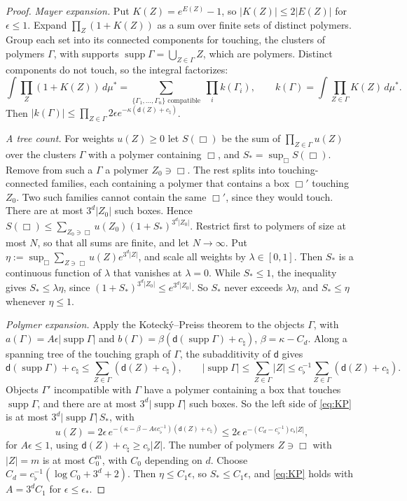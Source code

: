\begin{proof}
\emph{Mayer expansion.} Put $K(Z)=e^{E(Z)}-1$, so $|K(Z)|\le2|E(Z)|$ for $\epsilon\le1$. Expand $\prod_Z(1+K(Z))$ as a sum over finite sets of distinct polymers. Group each set into its connected components for touching, the clusters of polymers $\Gamma$, with supports $\operatorname{supp}\Gamma=\bigcup_{Z\in\Gamma}Z$, which are polymers. Distinct components do not touch, so the integral factorizes:
\[
\int\prod_Z(1+K(Z))\,d\mu^*=\sum_{\{\Gamma_1,\dots,\Gamma_n\}\text{ compatible}}\ \prod_ik(\Gamma_i),\qquad k(\Gamma)=\int\prod_{Z\in\Gamma}K(Z)\,d\mu^* .
\]
Then $|k(\Gamma)|\le\prod_{Z\in\Gamma}2\epsilon e^{-\kappa(\mathsf d(Z)+c_\natural)}$.

\emph{A tree count.} For weights $u(Z)\ge0$ let $S(\Box)$ be the sum of $\prod_{Z\in\Gamma}u(Z)$ over the clusters $\Gamma$ with a polymer containing $\Box$, and $S_*=\sup_\Box S(\Box)$. Remove from such a $\Gamma$ a polymer $Z_0\ni\Box$. The rest splits into touching-connected families, each containing a polymer that contains a box $\Box'$ touching $Z_0$. Two such families cannot contain the same $\Box'$, since they would touch. There are at most $3^d|Z_0|$ such boxes. Hence $S(\Box)\le\sum_{Z_0\ni\Box}u(Z_0)(1+S_*)^{3^d|Z_0|}$. Restrict first to polymers of size at most $N$, so that all sums are finite, and let $N\to\infty$. Put $\eta:=\sup_\Box\sum_{Z\ni\Box}u(Z)e^{3^d|Z|}$, and scale all weights by $\lambda\in[0,1]$. Then $S_*$ is a continuous function of $\lambda$ that vanishes at $\lambda=0$. While $S_*\le1$, the inequality gives $S_*\le\lambda\eta$, since $(1+S_*)^{3^d|Z_0|}\le e^{3^d|Z_0|}$. So $S_*$ never exceeds $\lambda\eta$, and $S_*\le\eta$ whenever $\eta\le1$.

\emph{Polymer expansion.} Apply the Koteck\'y--Preiss theorem to the objects $\Gamma$, with $a(\Gamma)=A\epsilon|\operatorname{supp}\Gamma|$ and $b(\Gamma)=\beta(\mathsf d(\operatorname{supp}\Gamma)+c_\natural)$, $\beta=\kappa-C_d$. Along a spanning tree of the touching graph of $\Gamma$, the subadditivity of $\mathsf d$ gives
\[
\mathsf d(\operatorname{supp}\Gamma)+c_\natural\le\sum_{Z\in\Gamma}(\mathsf d(Z)+c_\natural),\qquad|\operatorname{supp}\Gamma|\le\sum_{Z\in\Gamma}|Z|\le c_\flat^{-1}\sum_{Z\in\Gamma}(\mathsf d(Z)+c_\natural).
\]
Objects $\Gamma'$ incompatible with $\Gamma$ have a polymer containing a box that touches $\operatorname{supp}\Gamma$, and there are at most $3^d|\operatorname{supp}\Gamma|$ such boxes. So the left side of \eqref{eq:KP} is at most $3^d|\operatorname{supp}\Gamma|\,S_*$, with
\[
u(Z)=2\epsilon\,e^{-(\kappa-\beta-A\epsilon c_\flat^{-1})(\mathsf d(Z)+c_\natural)}\le2\epsilon\,e^{-(C_d-c_\flat^{-1})c_\flat|Z|},
\]
for $A\epsilon\le1$, using $\mathsf d(Z)+c_\natural\ge c_\flat|Z|$. The number of polymers $Z\ni\Box$ with $|Z|=m$ is at most $C_0^m$, with $C_0$ depending on $d$. Choose $C_d=c_\flat^{-1}(\log C_0+3^d+2)$. Then $\eta\le C_1\epsilon$, so $S_*\le C_1\epsilon$, and \eqref{eq:KP} holds with $A=3^dC_1$ for $\epsilon\le\epsilon_*$.


\end{proof}
